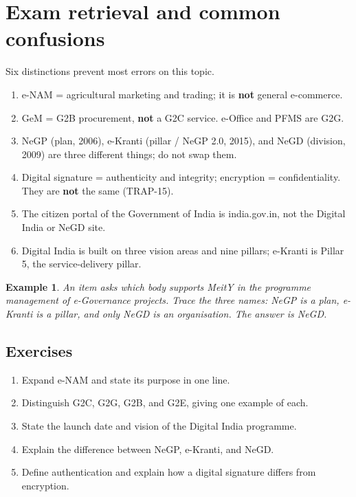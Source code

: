 \documentclass[11pt]{article}
\newtheorem{example}{Example}[section]
\begin{document}
\section{Exam retrieval and common confusions}
Six distinctions prevent most errors on this topic.
\begin{enumerate}
  \item e-NAM = agricultural marketing and trading; it is \textbf{not}
    general e-commerce.
  \item GeM = G2B procurement, \textbf{not} a G2C service. e-Office and PFMS
    are G2G.
  \item NeGP (plan, 2006), e-Kranti (pillar / NeGP 2.0, 2015), and NeGD
    (division, 2009) are three different things; do not swap them.
  \item Digital signature = authenticity and integrity; encryption =
    confidentiality. They are \textbf{not} the same (TRAP-15).
  \item The citizen portal of the Government of India is india.gov.in, not
    the Digital India or NeGD site.
  \item Digital India is built on three vision areas and nine pillars;
    e-Kranti is Pillar 5, the service-delivery pillar.
\end{enumerate}

\begin{example}
An item asks which body supports MeitY in the programme management of
e-Governance projects. Trace the three names: NeGP is a plan, e-Kranti is a
pillar, and only NeGD is an organisation. The answer is NeGD.
\end{example}

\subsection*{Exercises}
\begin{enumerate}[label=\arabic*.]
  \item Expand e-NAM and state its purpose in one line.
  \item Distinguish G2C, G2G, G2B, and G2E, giving one example of each.
  \item State the launch date and vision of the Digital India programme.
  \item Explain the difference between NeGP, e-Kranti, and NeGD.
  \item Define authentication and explain how a digital signature differs
    from encryption.
\end{enumerate}
\end{document}
